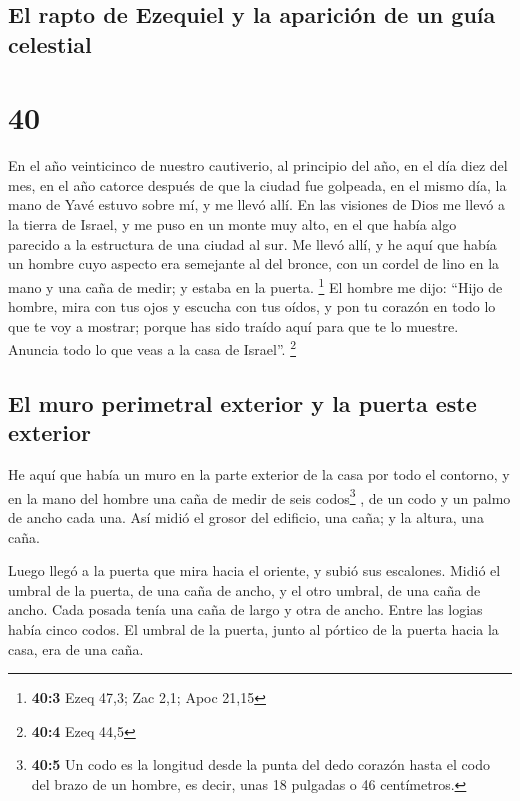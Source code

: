 \hypertarget{el-rapto-de-ezequiel-y-la-apariciuxf3n-de-un-guuxeda-celestial}{%
\subsection{El rapto de Ezequiel y la aparición de un guía
celestial}\label{el-rapto-de-ezequiel-y-la-apariciuxf3n-de-un-guuxeda-celestial}}

\hypertarget{section-39}{%
\section{40}\label{section-39}}

 En el año veinticinco de nuestro cautiverio, al principio
del año, en el día diez del mes, en el año catorce después de que la
ciudad fue golpeada, en el mismo día, la mano de Yavé estuvo sobre mí, y
me llevó allí.  En las visiones de Dios me llevó a la
tierra de Israel, y me puso en un monte muy alto, en el que había algo
parecido a la estructura de una ciudad al sur.  Me llevó
allí, y he aquí que había un hombre cuyo aspecto era semejante al del
bronce, con un cordel de lino en la mano y una caña de medir; y estaba
en la puerta. \footnote{\textbf{40:3} Ezeq 47,3; Zac 2,1; Apoc 21,15}
 El hombre me dijo: ``Hijo de hombre, mira con tus ojos y
escucha con tus oídos, y pon tu corazón en todo lo que te voy a mostrar;
porque has sido traído aquí para que te lo muestre. Anuncia todo lo que
veas a la casa de Israel''. \footnote{\textbf{40:4} Ezeq 44,5}

\hypertarget{el-muro-perimetral-exterior-y-la-puerta-este-exterior}{%
\subsection{El muro perimetral exterior y la puerta este
exterior}\label{el-muro-perimetral-exterior-y-la-puerta-este-exterior}}

 He aquí que había un muro en la parte exterior de la casa
por todo el contorno, y en la mano del hombre una caña de medir de seis
codos\footnote{\textbf{40:5} Un codo es la longitud desde la punta del
  dedo corazón hasta el codo del brazo de un hombre, es decir, unas 18
  pulgadas o 46 centímetros.} , de un codo y un palmo de ancho cada una.
Así midió el grosor del edificio, una caña; y la altura, una caña.

 Luego llegó a la puerta que mira hacia el oriente, y
subió sus escalones. Midió el umbral de la puerta, de una caña de ancho,
y el otro umbral, de una caña de ancho.  Cada posada tenía
una caña de largo y otra de ancho. Entre las logias había cinco codos.
El umbral de la puerta, junto al pórtico de la puerta hacia la casa, era
de una caña.

